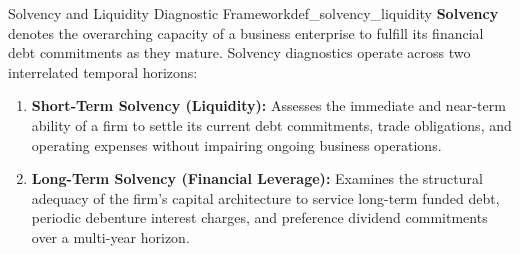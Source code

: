 \begin{definition}{Solvency and Liquidity Diagnostic Framework}{def_solvency_liquidity}
\textbf{Solvency} denotes the overarching capacity of a business enterprise to fulfill its financial debt commitments as they mature. Solvency diagnostics operate across two interrelated temporal horizons:
\begin{enumerate}[leftmargin=*, topsep=2pt, itemsep=2pt]
    \item \textbf{Short-Term Solvency (Liquidity):} Assesses the immediate and near-term ability of a firm to settle its current debt commitments, trade obligations, and operating expenses without impairing ongoing business operations.
    \item \textbf{Long-Term Solvency (Financial Leverage):} Examines the structural adequacy of the firm's capital architecture to service long-term funded debt, periodic debenture interest charges, and preference dividend commitments over a multi-year horizon.
\end{enumerate}
\end{definition}

